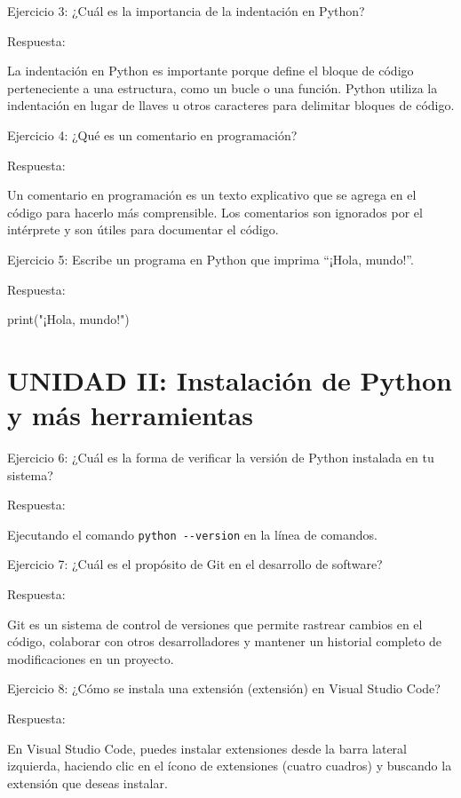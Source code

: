 \documentclass[
  a4paper,
  onepage,
  openany]{scrreprt}
\newenvironment{Shaded}{\begin{snugshade}}{\end{snugshade}}
\newcommand{\BuiltInTok}[1]{\textcolor[rgb]{0.00,0.23,0.31}{#1}}
\newcommand{\NormalTok}[1]{\textcolor[rgb]{0.00,0.23,0.31}{#1}}
\newcommand{\StringTok}[1]{\textcolor[rgb]{0.13,0.47,0.30}{#1}}
\begin{document}
Ejercicio 3: ¿Cuál es la importancia de la indentación en Python?

Respuesta:

La indentación en Python es importante porque define el bloque de código
perteneciente a una estructura, como un bucle o una función. Python
utiliza la indentación en lugar de llaves u otros caracteres para
delimitar bloques de código.

Ejercicio 4: ¿Qué es un comentario en programación?

Respuesta:

Un comentario en programación es un texto explicativo que se agrega en
el código para hacerlo más comprensible. Los comentarios son ignorados
por el intérprete y son útiles para documentar el código.

Ejercicio 5: Escribe un programa en Python que imprima ``¡Hola,
mundo!''.

Respuesta:

\begin{Shaded}
\begin{Highlighting}[]
\BuiltInTok{print}\NormalTok{(}\StringTok{"¡Hola, mundo!"}\NormalTok{)}
\end{Highlighting}
\end{Shaded}

\hypertarget{unidad-ii-instalaciuxf3n-de-python-y-muxe1s-herramientas}{%
\section{UNIDAD II: Instalación de Python y más
herramientas}\label{unidad-ii-instalaciuxf3n-de-python-y-muxe1s-herramientas}}

Ejercicio 6: ¿Cuál es la forma de verificar la versión de Python
instalada en tu sistema?

Respuesta:

Ejecutando el comando \texttt{python\ -\/-version} en la línea de
comandos.

Ejercicio 7: ¿Cuál es el propósito de Git en el desarrollo de software?

Respuesta:

Git es un sistema de control de versiones que permite rastrear cambios
en el código, colaborar con otros desarrolladores y mantener un
historial completo de modificaciones en un proyecto.

Ejercicio 8: ¿Cómo se instala una extensión (extensión) en Visual Studio
Code?

Respuesta:

En Visual Studio Code, puedes instalar extensiones desde la barra
lateral izquierda, haciendo clic en el ícono de extensiones (cuatro
cuadros) y buscando la extensión que deseas instalar.
\end{document}
